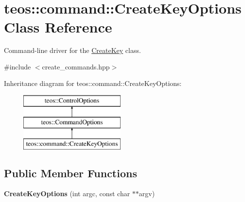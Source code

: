\hypertarget{classteos_1_1command_1_1_create_key_options}{}\section{teos\+:\+:command\+:\+:Create\+Key\+Options Class Reference}
\label{classteos_1_1command_1_1_create_key_options}


Command-\/line driver for the \mbox{\hyperlink{classteos_1_1command_1_1_create_key}{Create\+Key}} class.  




{\ttfamily \#include $<$create\+\_\+commands.\+hpp$>$}

Inheritance diagram for teos\+:\+:command\+:\+:Create\+Key\+Options\+:\begin{figure}[H]
\begin{center}
\leavevmode
\includegraphics[height=3.000000cm]{classteos_1_1command_1_1_create_key_options}
\end{center}
\end{figure}
\subsection*{Public Member Functions}
\begin{DoxyCompactItemize}
\item 
\mbox{\label{classteos_1_1command_1_1_create_key_options_afc955f866552d0f24ce9e09423b98778}} 
{\bfseries Create\+Key\+Options} (int argc, const char $\ast$$\ast$argv)
\end{DoxyCompactItemize}
